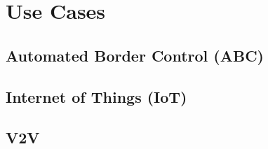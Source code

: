 \chapter{Use Cases}
\label{ch:usecases}

\section{Automated Border Control (ABC)}


\section{Internet of Things (IoT)}


\section{V2V}

